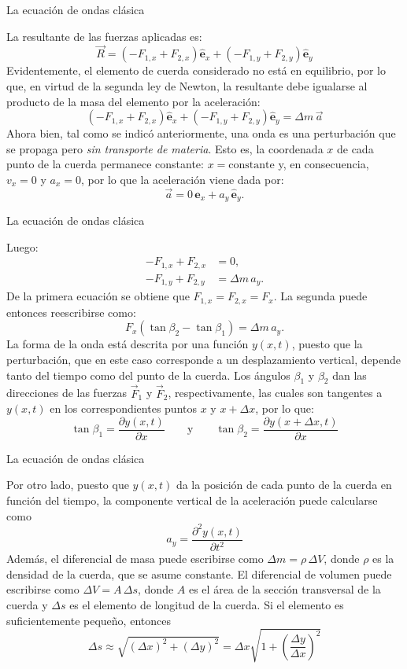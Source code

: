 \documentclass[11pt,handout,aspectratio=1610]{beamer}
\newcommand{\pdiff}[2]{\frac{\partial #1}{\partial #2}}
\newcommand{\pddiff}[2]{\frac{\partial^2 #1}{\partial #2^2}}
\newcommand{\ver}[1]{\hat{\mathbf{#1}}}
\begin{document}
\begin{frame}{La ecuación de ondas clásica}

    La resultante de las fuerzas aplicadas es: $$ \vec{R} = \left(-F_{1,x} + F_{2,x}\right) \ver{e}_x + \left(-F_{1,y} + F_{2,y}\right) \ver{e}_y $$ Evidentemente, el elemento de cuerda considerado no está en equilibrio, por lo que, en virtud de la segunda ley de Newton, la resultante debe igualarse al producto de la masa del elemento por la aceleración: $$ \left(-F_{1,x} + F_{2,x}\right) \ver{e}_x + \left(-F_{1,y} + F_{2,y}\right) \ver{e}_y = \Delta m \, \vec{a} $$ Ahora bien, tal como se indicó anteriormente, una onda es una perturbación que se propaga pero \emph{sin transporte de materia}. Esto es, la coordenada $x$ de cada punto de la cuerda permanece constante: $x = \text{constante}$ y, en consecuencia, $v_x = 0$ y $a_x = 0$, por lo que la aceleración viene dada por: $$ \vec{a} = 0 \, \ver{e}_x + a_y \, \ver{e}_y.$$

\end{frame}

\begin{frame}{La ecuación de ondas clásica}

    Luego:
    \begin{align*}
        -F_{1,x} + F_{2,x} &= 0, \\
        -F_{1,y} + F_{2,y} &= \Delta m \, a_y.
    \end{align*} De la primera ecuación se obtiene que $F_{1,x} = F_{2,x} = F_x$. La segunda puede entonces reescribirse como: $$ F_x \left(\tan \beta_2 - \tan \beta_1\right) = \Delta m \, a_y. $$ La forma de la onda está descrita por una función $y(x,t)$, puesto que la perturbación, que en este caso corresponde a un desplazamiento vertical, depende tanto del tiempo como del punto de la cuerda. Los ángulos $\beta_1$ y $\beta_2$ dan las direcciones de las fuerzas $\vec{F}_1$ y $\vec{F}_2$, respectivamente, las cuales son tangentes a $y(x,t)$ en los correspondientes puntos $x$ y $x + \Delta x$, por lo que: $$ \tan \beta_1 = \pdiff{y \left(x,t\right)}{x}  \qquad \text{y} \qquad \tan \beta_2 = \pdiff{y \left(x+\Delta x,t\right)}{x}$$
\end{frame}

\begin{frame}{La ecuación de ondas clásica}

    Por otro lado, puesto que $y(x,t)$ da la posición de cada punto de la cuerda en función del tiempo, la componente vertical de la aceleración puede calcularse como $$a_y = \pddiff{y \left(x,t\right)}{t} $$ Además, el diferencial de masa puede escribirse como $\Delta m = \rho \, \Delta V$, donde $\rho$ es la densidad de la cuerda, que se asume constante. El diferencial de volumen puede escribirse como $\Delta V = A \, \Delta s$, donde $A$ es el área de la sección transversal de la cuerda y $\Delta s$ es el elemento de longitud de la cuerda. Si el elemento es suficientemente pequeño, entonces $$\Delta s \approx \sqrt{\left(\Delta x\right)^2 + \left(\Delta y\right)^2} = \Delta x \sqrt{1 + \left(\frac{\Delta y}{\Delta x}\right)^2} $$

\end{frame}
\end{document}
